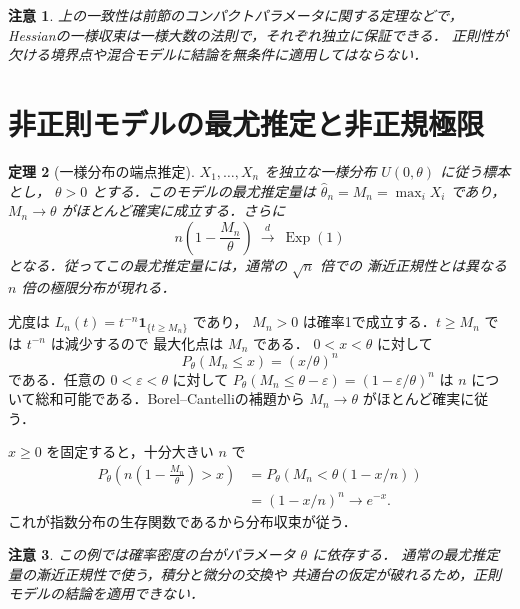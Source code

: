 \documentclass[a5paper,10pt,onecolumn]{jsarticle}
\makeatletter
\theoremstyle{mathnotetheorem}
\newtheorem{theorem}{定理}[section]
\newtheorem{remark}[theorem]{注意}
\renewcommand{\proofname}{証明}
\renewenvironment{proof}[1][\proofname]{%
  \par\pushQED{\qed}\normalfont\topsep4\p@\@plus2\p@\relax
  \trivlist\item[\hskip\labelsep\bfseries #1]\ignorespaces
}{\popQED\endtrivlist\@endpefalse}
\makeatother
\begin{document}
\begin{remark}
上の一致性は前節のコンパクトパラメータに関する定理などで，
Hessianの一様収束は一様大数の法則で，それぞれ独立に保証できる．
正則性が欠ける境界点や混合モデルに結論を無条件に適用してはならない．
\end{remark}

\section{非正則モデルの最尤推定と非正規極限}
\begin{theorem}[一様分布の端点推定]
$X_1,\ldots,X_n$ を独立な一様分布 $U(0,\theta)$ に従う標本とし，
$\theta>0$ とする．このモデルの最尤推定量は
$\widehat\theta_n=M_n=\max_iX_i$ であり，
$M_n\to\theta$ がほとんど確実に成立する．さらに
\[
 n\left(1-\frac{M_n}{\theta}\right)
 \ \xrightarrow{\ d\ }\ \operatorname{Exp}(1)
\]
となる．従ってこの最尤推定量には，通常の $\sqrt n$ 倍での
漸近正規性とは異なる $n$ 倍の極限分布が現れる．
\end{theorem}
\begin{proof}
尤度は $L_n(t)=t^{-n}\mathbf1_{\{t\ge M_n\}}$ であり，
$M_n>0$ は確率1で成立する．$t\ge M_n$ では $t^{-n}$ は減少するので
最大化点は $M_n$ である．
$0<x<\theta$ に対して
\[
 P_\theta(M_n\le x)=(x/\theta)^n
\]
である．任意の $0<\varepsilon<\theta$ に対して
$P_\theta(M_n\le\theta-\varepsilon)
 =(1-\varepsilon/\theta)^n$ は $n$ について総和可能である．Borel--Cantelliの補題から
$M_n\to\theta$ がほとんど確実に従う．

$x\ge0$ を固定すると，十分大きい $n$ で
\begin{align*}
 P_\theta\left(n\left(1-\frac{M_n}{\theta}\right)>x\right)
 &=P_\theta\left(M_n<\theta(1-x/n)\right)\\
 &=(1-x/n)^n\longrightarrow e^{-x}.
\end{align*}
これが指数分布の生存関数であるから分布収束が従う．
\end{proof}
\begin{remark}
この例では確率密度の台がパラメータ $\theta$ に依存する．
通常の最尤推定量の漸近正規性で使う，積分と微分の交換や
共通台の仮定が破れるため，正則モデルの結論を適用できない．
\end{remark}
\end{document}
